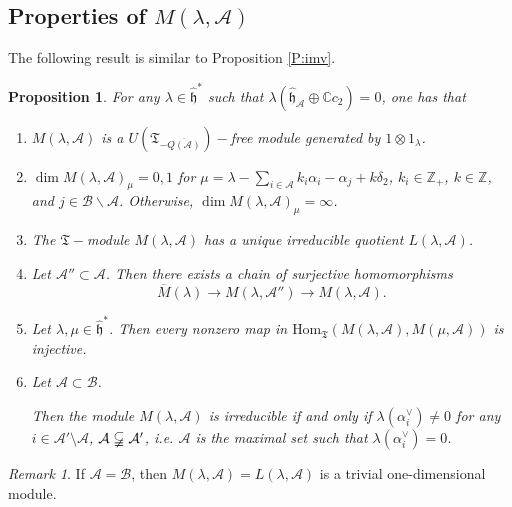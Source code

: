 \documentclass[11pt]{amsproc}
\newtheorem{proposition}{Proposition}[section]
\theoremstyle{definition}
\theoremstyle{remark}
\newtheorem{remark}[theorem]{Remark}
\numberwithin{equation}{section} \errorcontextlines=0
\begin{document}
\subsection{Properties of $M(\lambda,\mathcal {A})$}
The following result is similar to Proposition \ref{P:imv}.
\begin{proposition}\label{3} For any $\lambda\in\hat{\mathfrak h}^{\ast}$ such that ${\lambda}(\hat{\mathfrak h}_{\mathcal
{A}}\oplus\mathbb{C}c_2)=0$, one has that
\begin{enumerate}

\item  $M(\lambda,\mathcal {A})$ is a
$U(\mathfrak T_{-\overline{Q(\mathcal {A})}})-$free module
generated by $1\otimes 1_{\lambda}$.

\item $\dim M(\lambda,\mathcal {A})_{\mu}=0, 1$ 
for $\mu=\lambda-\sum\limits_{i\in \mathcal {A}}
 k_i\alpha_i-\alpha_j+k\delta_2$, $k_i\in\mathbb{Z}_+$, $k\in\mathbb{Z}$, and $j\in \mathcal
{B}\backslash \mathcal {A}$. Otherwise,
$\dim{M}(\lambda,\mathcal {A})_{\mu}=\infty$.

\item The $\mathfrak T-$module $M(\lambda,\mathcal {A})$ has a
unique irreducible quotient $L(\lambda,\mathcal {A})$.

\item Let
$\mathcal A''\subset \mathcal {A}$.
Then there exists a chain of
surjective homomorphisms
$$\overline{M}(\lambda)\rightarrow M(\lambda,\mathcal A'')\rightarrow M(\lambda,\mathcal {A}).$$

\item Let $\lambda,\mu\in\hat{\mathfrak h}^{\ast}$. Then every nonzero map in
$\text{Hom}_{\mathfrak T}(M(\lambda,\mathcal
{A}),M(\mu,\mathcal {A}))$ is injective.

\item Let
$\mathcal {A}\subset
\mathcal {B}$.

Then the module $M(\lambda,\mathcal {A})$ is irreducible if and only
if $\lambda(\alpha_i^{\vee})\neq 0$ for any $i\in \mathcal
A'\setminus \mathcal {A}$, $\mathcal {A}\varsubsetneqq \mathcal A'$,
i.e. $\mathcal A$ is the maximal set such that
${\lambda}(\alpha_i^{\vee})=0$.
\end{enumerate}
\end{proposition}

\begin{remark}
If $\mathcal {A}=\mathcal {B}$, then $M(\lambda,\mathcal
{A})=L(\lambda,\mathcal {A})$ is a trivial one-dimensional module.
\end{remark}
\end{document}
